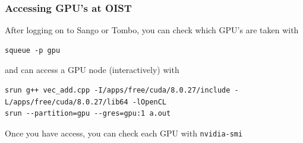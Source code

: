 \documentclass{beamer}
\begin{document}
\begin{frame}[fragile]
\frametitle{Accessing GPU's at OIST}

After logging on to Sango or Tombo, you can check which GPU's are taken with 

\begin{lstlisting}
squeue -p gpu
\end{lstlisting}

and can access a GPU node (interactively) with

\begin{lstlisting}
srun g++ vec_add.cpp -I/apps/free/cuda/8.0.27/include -L/apps/free/cuda/8.0.27/lib64 -lOpenCL
srun --partition=gpu --gres=gpu:1 a.out
\end{lstlisting}

Once you have access, you can check each GPU with \texttt{nvidia-smi}
\end{frame}
\end{document}
